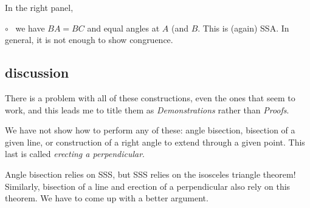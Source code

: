 \documentclass[11pt, oneside]{article}
\begin{document}
In the right panel, 

$\circ$ \  we have $BA = BC$ and equal angles at $A$ (and $B$.  This is (again) SSA.  In general, it is not enough to show congruence.

\subsection*{discussion}

There is a problem with all of these constructions, even the ones that seem to work, and this leads me to title them as \emph{Demonstrations} rather than \emph{Proofs}.

We have not show how to perform any of these:  angle bisection, bisection of a given line, or construction of a right angle to extend through a given point.  This last is called \emph{erecting a perpendicular}.

Angle bisection relies on SSS, but SSS relies on the isosceles triangle theorem!  Similarly, bisection of a line and erection of a perpendicular also rely on this theorem.  We have to come up with a better argument.
\end{document}
